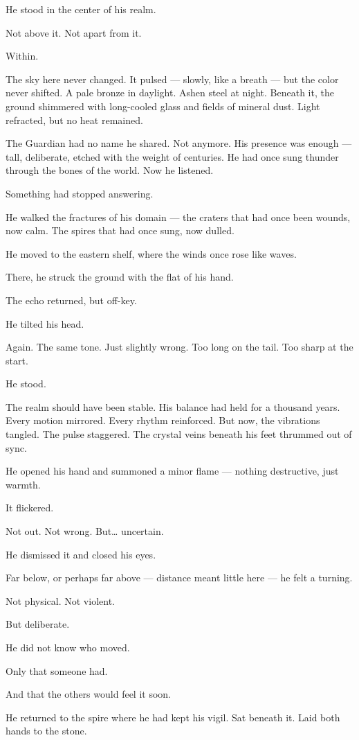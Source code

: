 \documentclass[12pt]{article}
\begin{document}
He stood in the center of his realm.

Not above it. Not apart from it.

Within.

The sky here never changed. It pulsed — slowly, like a breath — but the color never shifted. A pale bronze in daylight. Ashen steel at night. Beneath it, the ground shimmered with long-cooled glass and fields of mineral dust. Light refracted, but no heat remained.

The Guardian had no name he shared. Not anymore. His presence was enough — tall, deliberate, etched with the weight of centuries. He had once sung thunder through the bones of the world. Now he listened.

Something had stopped answering.

He walked the fractures of his domain — the craters that had once been wounds, now calm. The spires that had once sung, now dulled.

He moved to the eastern shelf, where the winds once rose like waves.

There, he struck the ground with the flat of his hand.

The echo returned, but off-key.

He tilted his head.

Again. The same tone. Just slightly wrong. Too long on the tail. Too sharp at the start.

He stood.

The realm should have been stable. His balance had held for a thousand years. Every motion mirrored. Every rhythm reinforced. But now, the vibrations tangled. The pulse staggered. The crystal veins beneath his feet thrummed out of sync.

He opened his hand and summoned a minor flame — nothing destructive, just warmth.

It flickered.

Not out. Not wrong. But… uncertain.

He dismissed it and closed his eyes.

Far below, or perhaps far above — distance meant little here — he felt a turning.

Not physical. Not violent.

But deliberate.

He did not know who moved.

Only that someone had.

And that the others would feel it soon.

He returned to the spire where he had kept his vigil. Sat beneath it. Laid both hands to the stone.
\end{document}
